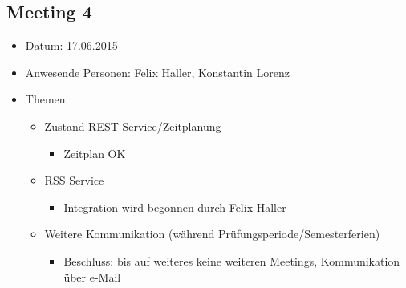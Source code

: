 \documentclass[12pt]{scrartcl}
\begin{document}
		\subsection{Meeting 4}
		\begin{itemize}
			\item Datum: 17.06.2015
			\item Anwesende Personen: Felix Haller, Konstantin Lorenz
			\item Themen:
			\begin{itemize}
				\item Zustand REST Service/Zeitplanung
				\begin{itemize}
					\item Zeitplan OK
				\end{itemize}
				\item RSS Service
				\begin{itemize}
					\item Integration wird begonnen durch Felix Haller
				\end{itemize}
				\item Weitere Kommunikation (während Prüfungsperiode/Semesterferien)
				\begin{itemize}
					\item Beschluss: bis auf weiteres keine weiteren Meetings, Kommunikation über e-Mail
				\end{itemize}
			\end{itemize}
		\end{itemize}
\end{document}
